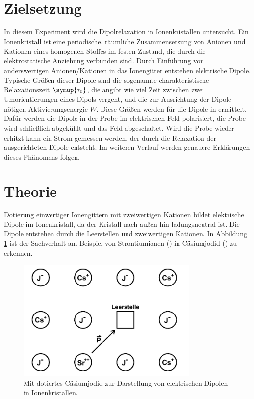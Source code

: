 \section{Zielsetzung}
\label{sec:Zielsetzung}

In diesem Experiment wird die Dipolrelaxation in Ionenkristallen untersucht.
Ein Ionenkristall ist eine periodische, räumliche Zusammensetzung von Anionen und Kationen eines homogenen Stoffes im festen Zustand, die durch die elektrostatische Anziehung verbunden sind.
Durch Einführung von anderswertigen Anionen/Kationen in das Ionengitter entstehen elektrische Dipole.
Typische Größen dieser Dipole sind die sogenannte charakteristische Relaxationszeit $\symup{\tau_0}$, die angibt wie viel Zeit zwischen zwei Umorientierungen eines Dipols vergeht, und die zur Ausrichtung der Dipole nötigen Aktivierungsenergie $W$.
Diese Größen werden für die Dipole in  ermittelt.
Dafür werden die Dipole in der Probe im elektrischen Feld polarisiert, die Probe wird schließlich abgekühlt und das Feld abgeschaltet.
Wird die Probe wieder erhitzt kann ein Strom gemessen werden, der durch die Relaxation der ausgerichteten Dipole entsteht. 
Im weiteren Verlauf werden genauere Erklärungen dieses Phänomens folgen.
\section{Theorie}
\label{sec:Theorie}
Dotierung einwertiger Ionengittern mit zweiwertigen Kationen bildet elektrische Dipole im Ionenkristall, da der Kristall nach außen hin ladungsneutral ist.
Die Dipole entstehen durch die Leerstellen und zweiwertigen Kationen.
In Abbildung \ref{fig:Dipol} ist der Sachverhalt am Beispiel von Strontiumionen () in Cäsiumjodid () zu erkennen.
\begin{figure}[htb]
  \centering
  \includegraphics[height=6cm]{pics/Dipole.png}
  \caption{Mit  dotiertes Cäsiumjodid  zur Darstellung von elektrischen Dipolen in Ionenkristallen. \cite{anleitung}}
  \label{fig:Dipol}
\end{figure}
\FloatBarrier

